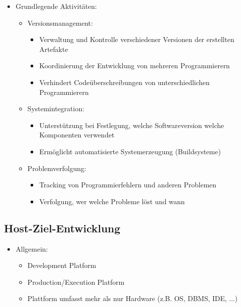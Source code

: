 \documentclass[11pt, a4paper]{article}
\begin{document}
\begin{itemize}
    \item Grundlegende Aktivitäten:
    \begin{itemize}
        \item Versionsmanagement:
        \begin{itemize}
            \item Verwaltung und Kontrolle verschiedener Versionen der erstellten Artefakte
            \item Koordinierung der Entwicklung von mehreren Programmierern
            \item Verhindert Codeüberschreibungen von unterschiedlichen Programmierern
        \end{itemize}
        \item Systemintegration:
        \begin{itemize}
            \item Unterstützung bei Festlegung, welche Softwareversion welche Komponenten verwendet
            \item Ermöglicht automatisierte Systemerzeugung (Buildsysteme)
        \end{itemize}
        \item Problemverfolgung:
        \begin{itemize}
            \item Tracking von Programmierfehlern und anderen Problemen
            \item Verfolgung, wer welche Probleme löst und wann
        \end{itemize}
    \end{itemize}
\end{itemize}


\raggedright \subsection{Host-Ziel-Entwicklung}

\begin{itemize}
    \item Allgemein:
    \begin{itemize}
        \item Development Platform
        \item Production/Execution Platform
        \item Plattform umfasst mehr als nur Hardware (z.B. OS, DBMS, IDE, ...)
    \end{itemize}
\end{itemize}
\end{document}
